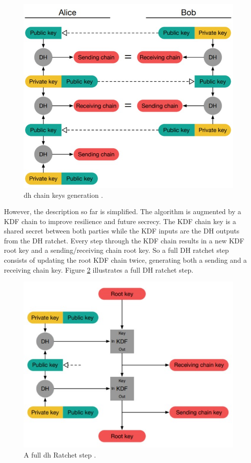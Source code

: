 \begin{figure}[hptb]
	\centering
	\includegraphics[scale=0.5]{Images/dh-chains.jpg}
	\caption{\gls{dh} chain keys generation \cite{dblRtcht}.}
	\label{fig:dh-chains}
\end{figure}
\par
However, the description so far is simplified. The algorithm is augmented by a KDF chain to improve resilience and future secrecy. The KDF chain key is a shared secret between both parties while the KDF inputs are the DH outputs from the DH ratchet. Every step through the KDF chain results in a new KDF root key and a sending/receiving chain root key. So a full DH ratchet step consists of updating the root KDF chain twice, generating both a sending and a receiving chain key. Figure \ref{fig:dh-ratchet_chain} illustrates a full DH ratchet step.

\begin{figure}[hptb]
	\centering
	\includegraphics[scale=0.65]{Images/fullDHRatchetStep.jpg}
	\caption{A full \gls{dh} Ratchet step \cite{dblRtcht}.}
	\label{fig:dh-ratchet_chain}
\end{figure}

